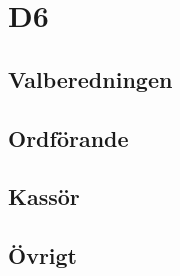 \section{D6}

\subsection{Valberedningen}
\begin{autoframe}

\end{autoframe}

\subsection{Ordförande}
\begin{autoframe}

\end{autoframe}

\subsection{Kassör}
\begin{autoframe}
\end{autoframe}

\subsection{Övrigt}
\begin{autoframe}
\end{autoframe}